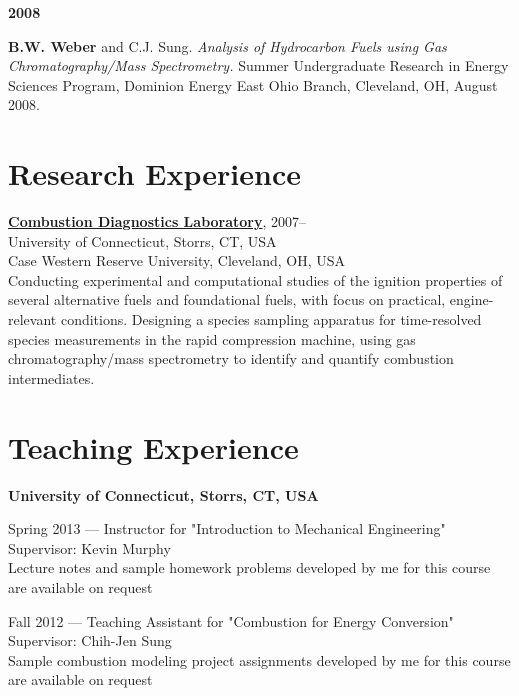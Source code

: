 \begin{bibsection}
\item[] \textbf{2008}
\item[] \textbf{ B.W. Weber} and C.J. Sung. \textit{Analysis of
        Hydrocarbon Fuels using Gas Chromatography/Mass Spectrometry.}
        Summer Undergraduate Research in Energy Sciences Program,
        Dominion Energy East Ohio Branch, Cleveland, OH, August 2008.
\end{bibsection}

\vspace{0.1in}

\section{{\sectionfont Research Experience}}

\href{http://combdiaglab.engr.uconn.edu}
{\textbf{Combustion Diagnostics Laboratory}}, 2007--\\
University of Connecticut, Storrs, CT, USA\\
Case Western Reserve University, Cleveland, OH, USA\\

Conducting experimental and computational studies of the ignition
properties of several alternative fuels and foundational fuels, with
focus on practical, engine-relevant conditions.
Designing a species sampling apparatus for time-resolved
species measurements in the rapid compression machine, using gas
chromatography/mass spectrometry to identify and quantify
combustion intermediates.

\section{{\sectionfont Teaching Experience}}

\textbf{University of Connecticut, Storrs, CT, USA}

\vspace{\baselineskip}

Spring 2013 --- Instructor for "Introduction to Mechanical Engineering"\\
Supervisor: Kevin Murphy\\
Lecture notes and sample homework problems developed by me for this course
are available on request

\vspace{\baselineskip}

Fall 2012 --- Teaching Assistant for "Combustion for Energy Conversion"\\
Supervisor: Chih-Jen Sung\\
Sample combustion modeling project assignments developed by me for this
course are available on request

